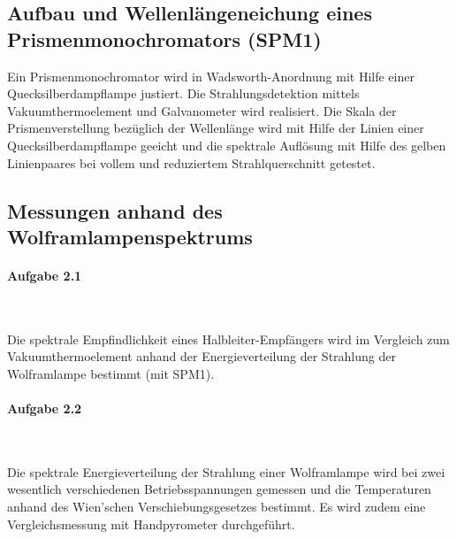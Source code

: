 \documentclass[a4paper,twoside,final]{article}
\begin{document}
\subsection{Aufbau und Wellenlängeneichung eines Prismenmonochromators (SPM1)}

Ein Prismenmonochromator wird in Wadsworth-Anordnung mit Hilfe einer Quecksilberdampflampe justiert. Die Strahlungsdetektion mittels Vakuumthermoelement und Galvanometer wird realisiert. Die Skala der Prismenverstellung bezüglich der Wellenlänge wird mit Hilfe der Linien einer Quecksilberdampflampe geeicht und die spektrale Auflösung mit Hilfe des gelben Linienpaares bei vollem und reduziertem Strahlquerschnitt getestet.

\subsection{Messungen anhand des Wolframlampenspektrums}

\paragraph{Aufgabe 2.1}$~$

Die spektrale Empfindlichkeit eines Halbleiter-Empfängers wird im Vergleich zum Vakuumthermoelement anhand der Energieverteilung der Strahlung der Wolframlampe bestimmt (mit SPM1).

\paragraph{Aufgabe 2.2}$~$

Die spektrale Energieverteilung der Strahlung einer Wolframlampe wird bei zwei wesentlich verschiedenen Betriebsspannungen gemessen und die Temperaturen anhand des Wien'schen Verschiebungsgesetzes bestimmt. Es wird zudem eine Vergleichsmessung mit Handpyrometer durchgeführt.
\end{document}
